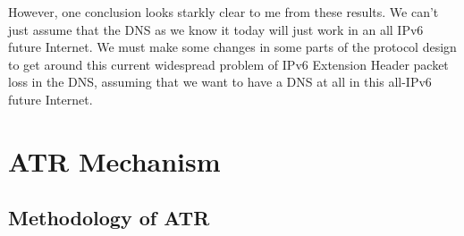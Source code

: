 






However, one conclusion looks starkly clear to me from these results. We can’t just assume that the DNS as we know it today will just work in an all IPv6 future Internet. We must make some changes in some parts of the protocol design to get around this current widespread problem of IPv6 Extension Header packet loss in the DNS, assuming that we want to have a DNS at all in this all-IPv6 future Internet.

\section{ATR Mechanism}

\subsection{Methodology of ATR}

